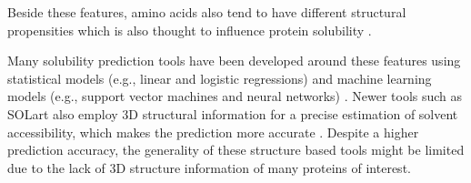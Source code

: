 

Beside these features, amino acids also tend to have different structural propensities which is also thought to influence protein solubility \cite{Idicula-Thomas2005-qw, Huang2012-ft}.


Many solubility prediction tools have been developed around these features using statistical models (e.g., linear and logistic regressions) and machine learning models (e.g., support vector machines and neural networks) \cite{Hirose2013-nq, Habibi2014-jq, Hebditch2017-bg, Sormanni2017-lo, Heckmann2018-wb, Wu2019-nz, Yang2019-kd}. Newer tools such as SOLart also employ 3D structural information for a precise estimation of solvent accessibility, which makes the prediction more accurate \cite{hou2020solart}. Despite a higher prediction accuracy, the generality of these structure based tools might be limited due to the lack of 3D structure information of many proteins of interest.



